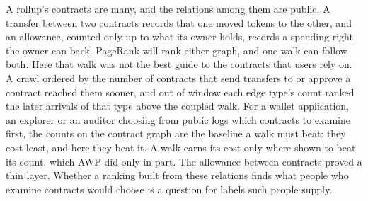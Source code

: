 
A rollup's contracts are many, and the relations among them are public. A transfer between two contracts records that one moved tokens to the other, and an allowance, counted only up to what its owner holds, records a spending right the owner can back. PageRank will rank either graph, and one walk can follow both. Here that walk was not the best guide to the contracts that users rely on. A crawl ordered by the number of contracts that send transfers to or approve a contract reached them sooner, and out of window each edge type's count ranked the later arrivals of that type above the coupled walk. For a wallet application, an explorer or an auditor choosing from public logs which contracts to examine first, the counts on the contract graph are the baseline a walk must beat: they cost least, and here they beat it. A walk earns its cost only where shown to beat its count, which AWP did only in part. The allowance between contracts proved a thin layer. Whether a ranking built from these relations finds what people who examine contracts would choose is a question for labels such people supply.
